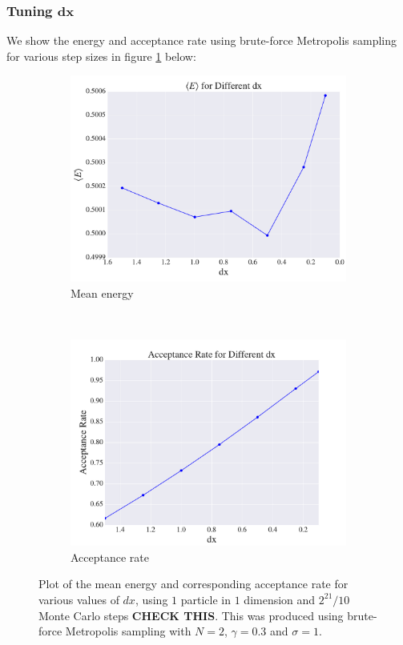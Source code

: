 \documentclass[a4paper, 10pt]{article}
\begin{document}
	 \subsubsection{Tuning $\boldsymbol{dx}$}
	 We show the energy and acceptance rate using brute-force Metropolis sampling for various step sizes in figure \ref{fig:results_benchmark_no_importance} below:
\begin{figure}[ht!]
\centering
 \begin{subfigure}[b]{0.8\textwidth}
 	\centering
 	\includegraphics[width=\textwidth]{../Results/E_v_dx_normal.pdf}
 	\caption{Mean energy}
 \end{subfigure}
 ~
 \begin{subfigure}[b]{0.8\textwidth}
 	 	\centering
 	 	\includegraphics[width=\textwidth]{../Results/AC_normal.pdf}
 	 	\caption{Acceptance rate}
\end{subfigure}
\caption{Plot of the mean energy and corresponding acceptance rate for various values of $dx$, using $1$ particle in $1$ dimension and $2^{21}/10$ Monte Carlo steps \textbf{CHECK THIS}. This was produced using brute-force Metropolis sampling with $N=2$, $\gamma=0.3$ and $\sigma=1$.}\label{fig:results_benchmark_no_importance}
\end{figure}
\end{document}
